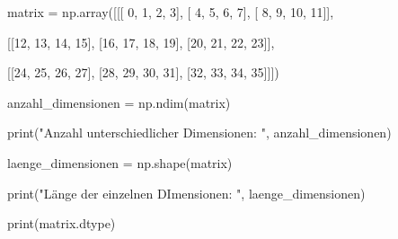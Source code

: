 \documentclass[
  letterpaper,
  DIV=11,
  numbers=noendperiod]{scrreprt}
\newenvironment{Shaded}{\begin{snugshade}}{\end{snugshade}}
\newcommand{\BuiltInTok}[1]{\textcolor[rgb]{0.00,0.23,0.31}{#1}}
\newcommand{\DecValTok}[1]{\textcolor[rgb]{0.68,0.00,0.00}{#1}}
\newcommand{\NormalTok}[1]{\textcolor[rgb]{0.00,0.23,0.31}{#1}}
\newcommand{\OperatorTok}[1]{\textcolor[rgb]{0.37,0.37,0.37}{#1}}
\newcommand{\StringTok}[1]{\textcolor[rgb]{0.13,0.47,0.30}{#1}}
\begin{document}
\begin{tcolorbox}
\begin{tcolorbox}
\begin{tcolorbox}[enhanced jigsaw, breakable, opacityback=0, left=2mm, coltitle=black, leftrule=.75mm, colframe=quarto-callout-caution-color-frame, opacitybacktitle=0.6, toprule=.15mm, bottomtitle=1mm, titlerule=0mm, toptitle=1mm, title={Lösung}, colbacktitle=quarto-callout-caution-color!10!white, arc=.35mm, bottomrule=.15mm, rightrule=.15mm, colback=white]

\begin{Shaded}
\begin{Highlighting}[]
\NormalTok{matrix }\OperatorTok{=}\NormalTok{ np.array([[[ }\DecValTok{0}\NormalTok{,  }\DecValTok{1}\NormalTok{,  }\DecValTok{2}\NormalTok{,  }\DecValTok{3}\NormalTok{],}
\NormalTok{                 [ }\DecValTok{4}\NormalTok{,  }\DecValTok{5}\NormalTok{,  }\DecValTok{6}\NormalTok{,  }\DecValTok{7}\NormalTok{],}
\NormalTok{                 [ }\DecValTok{8}\NormalTok{,  }\DecValTok{9}\NormalTok{, }\DecValTok{10}\NormalTok{, }\DecValTok{11}\NormalTok{]],}

\NormalTok{                [[}\DecValTok{12}\NormalTok{, }\DecValTok{13}\NormalTok{, }\DecValTok{14}\NormalTok{, }\DecValTok{15}\NormalTok{],}
\NormalTok{                 [}\DecValTok{16}\NormalTok{, }\DecValTok{17}\NormalTok{, }\DecValTok{18}\NormalTok{, }\DecValTok{19}\NormalTok{],}
\NormalTok{                 [}\DecValTok{20}\NormalTok{, }\DecValTok{21}\NormalTok{, }\DecValTok{22}\NormalTok{, }\DecValTok{23}\NormalTok{]],}

\NormalTok{                [[}\DecValTok{24}\NormalTok{, }\DecValTok{25}\NormalTok{, }\DecValTok{26}\NormalTok{, }\DecValTok{27}\NormalTok{],}
\NormalTok{                 [}\DecValTok{28}\NormalTok{, }\DecValTok{29}\NormalTok{, }\DecValTok{30}\NormalTok{, }\DecValTok{31}\NormalTok{],}
\NormalTok{                 [}\DecValTok{32}\NormalTok{, }\DecValTok{33}\NormalTok{, }\DecValTok{34}\NormalTok{, }\DecValTok{35}\NormalTok{]]])}

\NormalTok{anzahl\_dimensionen }\OperatorTok{=}\NormalTok{ np.ndim(matrix)}

\BuiltInTok{print}\NormalTok{(}\StringTok{"Anzahl unterschiedlicher Dimensionen: "}\NormalTok{, anzahl\_dimensionen)}

\NormalTok{laenge\_dimensionen }\OperatorTok{=}\NormalTok{ np.shape(matrix)}

\BuiltInTok{print}\NormalTok{(}\StringTok{"Länge der einzelnen DImensionen: "}\NormalTok{, laenge\_dimensionen)}

\BuiltInTok{print}\NormalTok{(matrix.dtype)}
\end{Highlighting}
\end{Shaded}


\end{tcolorbox}
\end{tcolorbox}
\end{tcolorbox}
\end{document}
